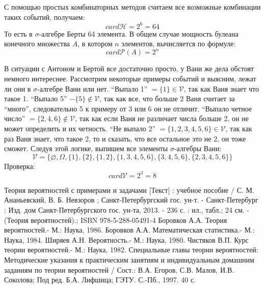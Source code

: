 \begin{exmp}
	С помощью простых комбинаторных методов считаем все возможные комбинации таких событий, получаем:
	\[ card\mathcal{H}=2^6=64 \]
	То есть в $\sigma$-алгебре Берты 64 элемента. В общем случае мощность булеана конечного множества $A$, в котором $n$ элементов, вычисляется по формуле:
	\[ card \mathcal{P} (A) = 2^n \]
	
	В ситуации с Антоном и Бертой все достаточно просто, у Вани же дела обстоят немного интереснее. Рассмотрим некоторые примеры событий и выясним, лежат ли они в $\sigma$-алгебре Вани или нет. “Выпало 1” $= \{ 1 \} \in \mathcal{V}$, так как Ваня знает что такое 1. “Выпало 5” $- \{ 5 \} \notin \mathcal{V}$, так как все, что больше 2 Ваня считает за “много”, следовательно 5 к примеру от 3 или 6 он не отличит. “Выпало четное число” $=\{ 2, 4, 6 \} \notin \mathcal{V}$, так как если Ваня не различает числа больше 2, он не может определить и их четность. “Не выпало 2” $=\{ 1, 2, 3, 4, 5, 6 \} \in \mathcal{V}$, так как раз Ваня знает, что такое 2, то и сказать, что все остальное это не 2, он тоже сможет. Следуя этой логике, выпишем все элементы $\sigma$-алгебры Вани:
	\[ \mathcal{V}=\{\varnothing,\Omega,\{1\},\{2\},\{1,2\},\{1,3,4,5,6\},\{3,4,5,6\},\{2,3,4,5,6\}\} \]
	Проверка:
	\[ card \mathcal{V} = 2^3 = 8 \]
\end{exmp}

\newpage


\begin{thebibliography}{6}
	Теория вероятностей с примерами и задачами [Текст] : учебное пособие / С. М. Ананьевский, В. Б. Невзоров ; Санкт-Петербургский гос. ун-т. - Санкт-Петербург : Изд. дом Санкт-Петербургского гос. ун-та, 2013. - 236 с. : ил., табл.; 24 см. - (Теория вероятностей).; ISBN 978-5-288-05491-4
	Боровков А.А. Теория вероятностей.- М.: Наука, 1986.
	Боровков А.А. Математическая статистика.- М.: Наука, 1984.
	Ширяев А.Н. Вероятность.- М.: Наука, 1980.
	Чистяков В.П. Курс теории вероятностей.- М.: Наука, 1982.
	Специальные главы теории вероятностей: Методические указания к практическим занятиям и индивидуальным домашним заданиям по теории вероятностей / Сост.: В.А. Егоров, С.В. Малов, И.В. Соколова; Под ред. Б.А. Лифшица; ГЭТУ. С.-Пб., 1997. 40 с.
\end{thebibliography}

